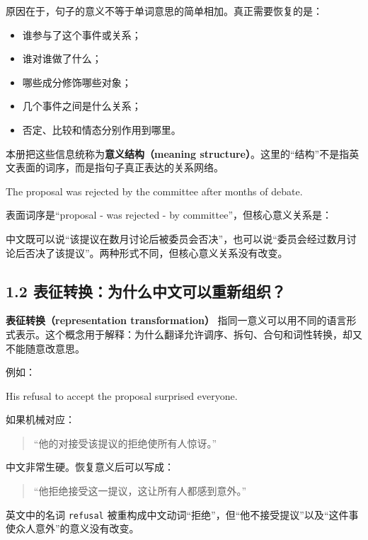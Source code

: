 \documentclass[11pt,a4paper]{ctexart}
\newcommand{\term}[2]{\textbf{#1（#2）}}
\begin{document}
原因在于，句子的意义不等于单词意思的简单相加。真正需要恢复的是：
\begin{itemize}
  \item 谁参与了这个事件或关系；
  \item 谁对谁做了什么；
  \item 哪些成分修饰哪些对象；
  \item 几个事件之间是什么关系；
  \item 否定、比较和情态分别作用到哪里。
\end{itemize}

本册把这些信息统称为\term{意义结构}{meaning structure}。这里的“结构”不是指英文表面的词序，而是指句子真正表达的关系网络。

\begin{eng}[例 1：词序不是意义结构]
The proposal was rejected by the committee after months of debate.
\end{eng}
表面词序是“proposal - was rejected - by committee”，但核心意义关系是：
\begin{center}
\end{center}
中文既可以说“该提议在数月讨论后被委员会否决”，也可以说“委员会经过数月讨论后否决了该提议”。两种形式不同，但核心意义关系没有改变。

\subsection{1.2 表征转换：为什么中文可以重新组织？}
\term{表征转换}{representation transformation} 指同一意义可以用不同的语言形式表示。这个概念用于解释：为什么翻译允许调序、拆句、合句和词性转换，却又不能随意改意思。

例如：
\begin{eng}[例 2：名词结构可以转换为动词表达]
His refusal to accept the proposal surprised everyone.
\end{eng}
如果机械对应：
\begin{quote}
“他的对接受该提议的拒绝使所有人惊讶。”
\end{quote}
中文非常生硬。恢复意义后可以写成：
\begin{quote}
“他拒绝接受这一提议，这让所有人都感到意外。”
\end{quote}
英文中的名词 \texttt{refusal} 被重构成中文动词“拒绝”，但“他不接受提议”以及“这件事使众人意外”的意义没有改变。
\end{document}
